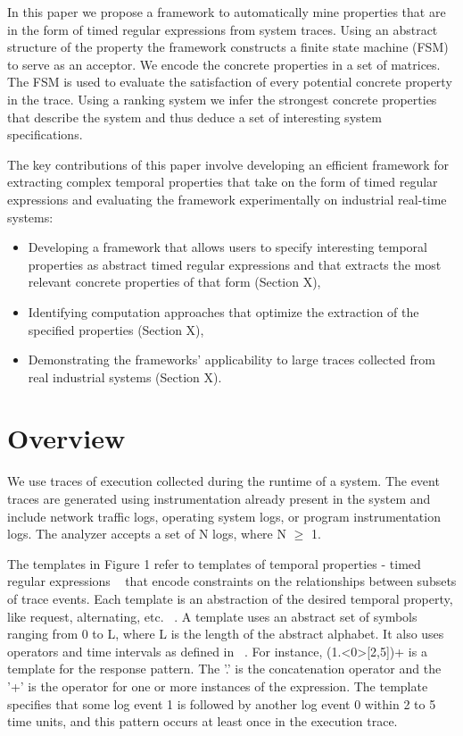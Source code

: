 \documentclass[]{sigplanconf}
\begin{document}
In this paper we propose a framework to automatically mine properties that are in the form of timed regular expressions from system traces. Using an abstract structure of the property the framework constructs a finite state machine (FSM) to serve as an acceptor. We encode the concrete properties in a set of matrices. The FSM is used to evaluate the satisfaction of every potential concrete property in the trace. Using a ranking system we infer the strongest concrete properties that describe the system and thus deduce a set of interesting system specifications. 

The key contributions of this paper involve developing an efficient framework for extracting complex temporal properties that take on the form of timed regular expressions and evaluating the framework experimentally on industrial real-time systems:

\begin{itemize}
\item Developing a framework that allows users to specify interesting temporal properties as abstract timed regular expressions and that extracts the most relevant concrete properties of that form (Section X),
\item Identifying computation approaches that optimize the extraction of the specified properties (Section X),
\item Demonstrating the frameworks' applicability to large traces collected from real industrial systems  (Section X).
\end{itemize}


\section{Overview}

We use traces of execution collected during the runtime of a system. The event traces are generated using instrumentation already present in the system and include network traffic logs, operating system logs, or program instrumentation logs. The analyzer accepts a set of N logs, where N $\ge$ 1.

The templates in Figure 1 refer to templates of temporal properties - timed regular expressions ~\cite{timedregex} that encode constraints on the relationships between subsets of trace events. Each template is an abstraction of the desired temporal property, like request, alternating, etc. ~\cite{evans1}. A template uses an abstract set of symbols ranging from 0 to L, where L is the length of the abstract alphabet. It also uses operators and time intervals as defined in ~\cite{timedregex}. For instance, (1.\textless0\textgreater[2,5])+ is a template for the response pattern. The '.' is the concatenation operator and the '+' is the operator for one or more instances of the expression.  The template specifies that some log event 1 is followed by another log event 0 within 2 to 5 time units, and this pattern occurs at least once in the execution trace. 
\end{document}
